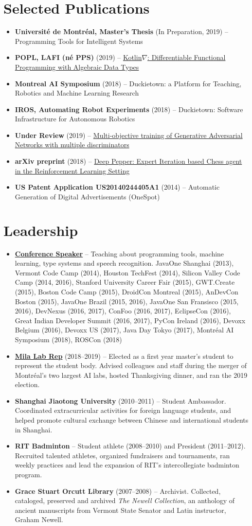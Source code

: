 \documentclass[letterpaper,11pt]{article}
\newcommand{\resumeItem}[2]{
\item\small{
\textbf{#1}{ #2 \vspace{-2pt}}
}
}
\newcommand{\resumeSubItem}[2]{\resumeItem{#1}{#2}}
\newcommand{\resumeSubHeadingListStart}{\begin{itemize}[leftmargin=*]}
\newcommand{\resumeSubHeadingListEnd}{\end{itemize}}
\begin{document}
\begin{justify}
\section{Selected Publications}
\resumeSubHeadingListStart
\resumeSubItem{Universit\'e de Montr\'eal, Master's Thesis} {(In Preparation, 2019) -- Programming Tools for Intelligent Systems}
\resumeSubItem{POPL, LAFI (n\'e PPS)} {(2019) -- \href{https://github.com/breandan/kotlingrad}{Kotlin$\nabla$: Differentiable Functional Programming with Algebraic Data Types}}
\resumeSubItem{Montreal AI Symposium} {(2018) -- Duckietown: a Platform for Teaching, Robotics and Machine Learning Research}
\resumeSubItem{IROS, Automating Robot Experiments} {(2018) -- Duckietown: Software Infrastructure for Autonomous Robotics}
\resumeSubItem{Under Review} {(2019) -- \href{https://arxiv.org/abs/1901.08680}{Multi-objective training of Generative Adversarial Networks with multiple discriminators}}
\resumeSubItem{arXiv preprint} {(2018) -- \href{https://arxiv.org/abs/1806.00683}{Deep Pepper: Expert Iteration based Chess agent in the Reinforcement Learning Setting}}
\resumeSubItem{US Patent Application US20140244405A1} {(2014) -- Automatic Generation of Digital Advertisements (OneSpot)}
\resumeSubHeadingListEnd

\section{Leadership}
\resumeSubHeadingListStart
\resumeSubItem{\href{https://speakerdeck.com/breandan}{Conference Speaker}} {-- Teaching about programming tools, machine learning, type systems and speech recognition. JavaOne Shanghai (2013), Vermont Code Camp (2014), Houston TechFest (2014), Silicon Valley Code Camp (2014, 2016), Stanford University Career Fair (2015), GWT.Create (2015), Boston Code Camp (2015), DroidCon Montreal (2015), AnDevCon Boston (2015), JavaOne Brazil (2015, 2016), JavaOne San Fransisco (2015, 2016), DevNexus (2016, 2017), ConFoo (2016, 2017), EclipseCon (2016), Great Indian Developer Summit (2016, 2017), PyCon Ireland (2016), Devoxx Belgium (2016), Devoxx US (2017), Java Day Tokyo (2017), Montr\'eal AI Symposium (2018), ROSCon (2018)}
\resumeSubItem{\href{https://mila.quebec/}{Mila Lab Rep}} {(2018--2019) -- Elected as a first year master's student to represent the student body. Advised colleagues and staff during the merger of Montr\'eal's two largest AI labs, hosted Thanksgiving dinner, and ran the 2019 election.}
\resumeSubItem{Shanghai Jiaotong University} {(2010--2011) -- Student Ambassador. Coordinated extracurricular activities for foreign language students, and helped promote cultural exchange between Chinese and international students in Shanghai.}
\resumeSubItem{RIT Badminton} {-- Student athlete (2008--2010) and President (2011--2012). Recruited talented athletes, organized fundraisers and tournaments, ran weekly practices and lead the expansion of RIT's intercollegiate badminton program.}
\resumeSubItem{Grace Stuart Orcutt Library} {(2007--2008) -- Archivist. Collected, cataloged, preserved and archived \textit{The Newell Collection}, an anthology of ancient manuscripts from Vermont State Senator and Latin instructor, Graham Newell.}
\resumeSubHeadingListEnd


\end{justify}
\end{document}
